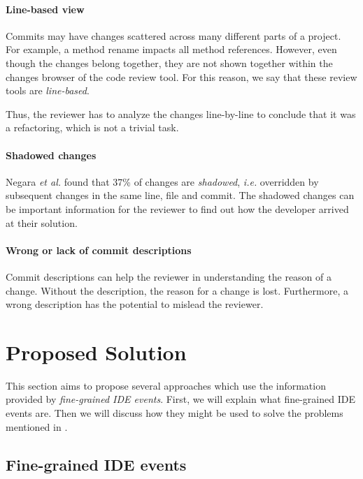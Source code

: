 \documentclass[conference,a4paper]{IEEEtran}
\newcommand{\citeneeded}{\textbf{{[}citation needed{]}}}
\begin{document}
\paragraph{Line-based view}

Commits may have changes scattered across many different parts of a
project. For example, a method rename impacts all method
references. However, even though the changes belong together, they are
not shown together within the changes browser of the code review
tool. For this reason, we say that these review tools are
\textit{line-based}.

Thus, the reviewer has to analyze the changes line-by-line to conclude
that it was a refactoring, which is not a trivial task.

\paragraph{Shadowed changes}

Negara \textit{et al.} found that 37\% of changes are
\textit{shadowed}, \textit{i.e.} overridden by subsequent changes in
the same line, file and commit\cite{Nega12a}. The shadowed changes can
be important information for the reviewer to find out how the
developer arrived at their solution.

\paragraph{Wrong or lack of commit descriptions}

Commit descriptions can help the reviewer in understanding the reason
of a change. Without the description, the reason for a change is
lost. Furthermore, a wrong description has the potential to mislead
the reviewer.

\section{Proposed Solution}
\label{sec:proposed-solution}
This section aims to propose several approaches which use the
information provided by \textit{fine-grained IDE events}. First, we
will explain what fine-grained IDE events are. Then we will discuss
how they might be used to solve the problems mentioned in
.

\subsection{Fine-grained IDE events}
\label{sec:fine-grained-ide}
\end{document}
